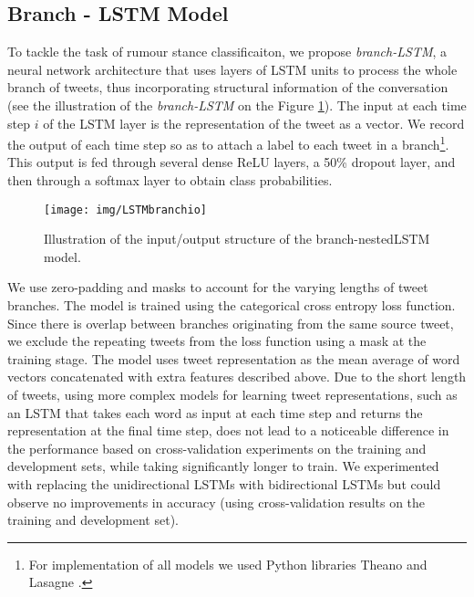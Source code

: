 \documentclass[11pt,a4paper]{article}
\begin{document}
\subsection{Branch - LSTM Model}
 To tackle the task of rumour stance classificaiton, we propose \textit{branch-LSTM}, a neural network architecture that uses layers of LSTM units \cite{hochreiter1997long} to process the whole branch of tweets, thus incorporating structural information of the conversation (see the illustration of the \textit{branch-LSTM} on the Figure \ref{fig:hlstm}). The input at each time step $i$  of the LSTM layer is the representation of the tweet as a vector.  We record the output of each time step so as to attach a label to each tweet in a branch\footnote{For implementation of all models we used Python libraries Theano \cite{bastien2012theano} and Lasagne \cite{lasagne}.}. This output is fed through several dense ReLU layers, a 50\% dropout layer,  and then through a softmax layer to obtain class probabilities. 
 \begin{figure}
	\centering
	\texttt{[image: img/LSTMbranchio]}
	\vspace{-0.9cm}
	\caption{Illustration of the input/output structure of the branch-nestedLSTM model.} \vspace{-0.2cm}
	\label{fig:hlstm}
\end{figure}
We use zero-padding and masks to account for the varying lengths of tweet branches. The model is trained using the categorical cross entropy loss function.
Since there is overlap between branches originating from the same source tweet, we exclude the repeating tweets from the loss function using a mask at the training stage.
The model uses tweet representation as the mean average of word vectors concatenated with extra features described above. Due to the short length of tweets, using more complex models for learning tweet representations, such as an LSTM that takes each word as input at each time step and returns the representation at the final time step, does not lead to a noticeable difference in the performance based on cross-validation experiments on the training and development sets, while taking significantly longer to train.
We experimented with replacing the unidirectional LSTMs with bidirectional LSTMs but could observe no improvements in accuracy (using cross-validation results on the training and development set). 
\end{document}
